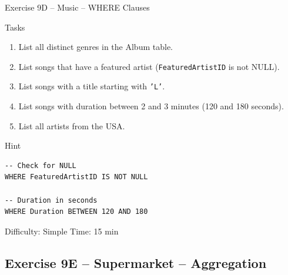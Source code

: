\documentclass[10pt]{beamer}
\begin{document}
\begin{frame}[fragile]{Exercise 9D -- Music -- WHERE Clauses}
  \begin{block}{Tasks}
    \begin{enumerate}
      \item List all distinct genres in the Album table.
      \item List songs that have a featured artist (\texttt{FeaturedArtistID} is not NULL).
      \item List songs with a title starting with \texttt{'L'}.
      \item List songs with duration between 2 and 3 minutes (120 and 180 seconds).
      \item List all artists from the USA.
    \end{enumerate}
  \end{block}

  \begin{block}{Hint}
\begin{lstlisting}[style=sqlstyle]
-- Check for NULL
WHERE FeaturedArtistID IS NOT NULL

-- Duration in seconds
WHERE Duration BETWEEN 120 AND 180
\end{lstlisting}
  \end{block}

  \begin{alertblock}{Difficulty: Simple \quad Time: 15 min}
  \end{alertblock}
\end{frame}

\subsection{Exercise 9E -- Supermarket -- Aggregation}
\end{document}
